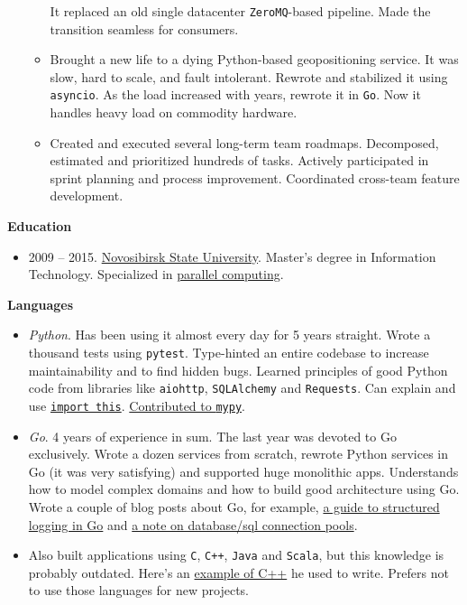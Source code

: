 \documentclass[final]{letter}
\def\code#1{\texttt{#1}}
\begin{document}
\begin{itemize}
\begin{itemize}
      It replaced an old single datacenter \code{ZeroMQ}-based pipeline.
      Made the transition seamless for consumers.
    \item Brought a new life to a dying Python-based geopositioning service.
    It was slow, hard to scale, and fault intolerant.
      Rewrote and stabilized it using \code{asyncio}.
      As the load increased with years, rewrote it in \code{Go}.
      Now it handles heavy load on commodity hardware.
    \item Created and executed several long-term team roadmaps.
     Decomposed, estimated and prioritized hundreds of tasks.
    Actively participated in sprint planning and process improvement.
    Coordinated cross-team feature development.
  \end{itemize}

  \end{itemize}

{\bf Education}
\begin{itemize}
  \item 2009 -- 2015. \href{https://www.nsu.ru/n/}{Novosibirsk State University}.
  Master's degree in Information Technology.
  Specialized in \href{http://ssd.sscc.ru/en/info}{parallel computing}.
\end{itemize}

{\bf Languages}
\begin{itemize}
\item \textit{Python}. Has been using it almost every day for 5 years straight.
  Wrote a thousand tests using \code{pytest}.
  Type-hinted an entire codebase to increase maintainability and to find hidden bugs.
  Learned principles of good Python code from libraries like \code{aiohttp}, \code{SQLAlchemy} and \code{Requests}.
  Can explain and use \href{https://www.python.org/dev/peps/pep-0020/}{\code{import this}}.
  \href{https://mypy-lang.blogspot.com/2019/06/mypy-0710-released-new-semantic-analyzer.html}{Contributed to \code{mypy}}.
  \item \textit{Go}. 4 years of experience in sum. 
   The last year was devoted to Go exclusively.
   Wrote a dozen services from scratch, rewrote Python services in Go (it was very satisfying) and supported huge monolithic apps.
   Understands how to model complex domains and how to build good architecture using Go.
   Wrote a couple of blog posts about Go, for example, \href{https://neexee.github.io/posts-en/how-to-structured-logging-in-go/}{a guide to structured logging in Go} and \href{https://neexee.github.io/posts-en/distributed-deadlock/}{a note on database/sql connection pools}. 
  \item Also built applications using \code{C}, \code{C++}, \code{Java} and \code{Scala}, but this knowledge is probably outdated. Here's an \href{https://github.com/neexee/review}{example of C++} he used to write. Prefers not to use those languages for new projects.
\end{itemize}
\end{document}
